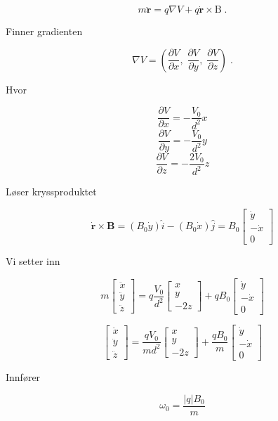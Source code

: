 \documentclass[reprint,english,notitlepage, nofootinbib]{revtex4-1}  %
\begin{document}
$$m \ddot{\mathbf{r}} = q \nabla{V} + q \dot{\mathbf{r}} \times\mathrm{B} \; .$$

Finner gradienten

$$\nabla{V} = \left ( \frac{\partial V}{\partial x}, \; \frac{\partial V}{\partial y}, \; \frac{\partial V}{\partial z} \right ) \; .$$

Hvor

$$ \frac{\partial V}{\partial x} = -\frac{V_0}{d^2}x$$
$$ \frac{\partial V}{\partial y} = - \frac{V_0}{d^2}y$$
$$ \frac{\partial V}{\partial z} = - \frac{2V_0}{d^2}z$$

Løser kryssproduktet

$$\dot{\mathbf{r}} \times \mathbf{B} = (B_0 \dot{y})\hat{i} - (B_0\dot{x})\hat{j} = B_0 \begin{bmatrix}
\dot{y} \\ -\dot{x} \\ 0
\end{bmatrix}$$

Vi setter inn

$$ m \begin{bmatrix} \ddot{x} \\ \ddot{y} \\ \ddot{z} \end{bmatrix} = q \frac{V_0}{d^2} \begin{bmatrix}
x \\ y \\ -2z 
\end{bmatrix} + q B_0 \begin{bmatrix}
\dot{y} \\ -\dot{x} \\ 0
\end{bmatrix}$$

$$\begin{bmatrix} \ddot{x} \\ \ddot{y} \\ \ddot{z} \end{bmatrix} = \frac{qV_0}{md^2} \begin{bmatrix}
x \\ y \\ -2z 
\end{bmatrix} + \frac{qB_0}{m} \begin{bmatrix}
\dot{y} \\ -\dot{x} \\ 0
\end{bmatrix}$$ 

Innfører 

$$\omega_0 = \frac{|q|B_0}{m}$$
\end{document}
